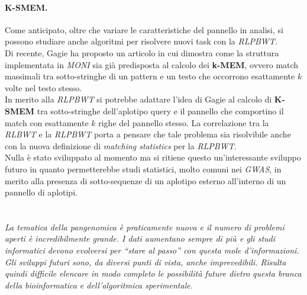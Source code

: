 \paragraph{K-SMEM.}
Come anticipato, oltre che variare le caratteristiche del pannello in analisi,
si possono studiare anche algoritmi per risolvere nuovi task con la
\textit{RLPBWT}.\\ 
Di recente, Gagie \cite{kmems} ha proposto un articolo in cui dimostra come
la struttura implementata in \textit{MONI} \cite{moni} sia già predisposta al
calcolo dei \textbf{k-MEM}, ovvero match massimali tra sotto-stringhe di un
pattern e un testo che occorrono esattamente $k$ volte nel testo stesso.\\
In merito alla \textit{RLPBWT} si potrebbe adattare l'idea di Gagie al calcolo
di \textbf{K-SMEM} tra sotto-stringhe dell'aplotipo query e il pannello che
comportino il match con esattamente $k$ righe del pannello stesso. La
correlazione tra la \textit{RLBWT} e la \textit{RLPBWT} 
porta a pensare che tale problema sia risolvibile anche con la nuova definizione
di \textit{matching statistics} per la \textit{RLPBWT}.\\
Nulla è stato sviluppato al momento ma si ritiene questo
un'interessante sviluppo futuro in quanto permetterebbe studi statistici, molto
comuni nei \textit{GWAS}, in merito alla presenza di sotto-sequenze di un
aplotipo esterno all'interno di un pannello di aplotipi.\\
\\
\\
\textit{La tematica della \emph{pangenomica} è praticamente nuova e il numero di
problemi aperti è incredibilmente grande. I dati aumentano sempre di più e gli
studi informatici devono evolversi per ``stare al passo'' con questa mole
d'informazioni. Gli \emph{sviluppi futuri} sono, da diversi punti di vista,
anche imprevedibili. Risulta quindi difficile elencare in modo completo le
possibilità future dietro questa branca della bioinformatica e dell'algoritmica
sperimentale.}
